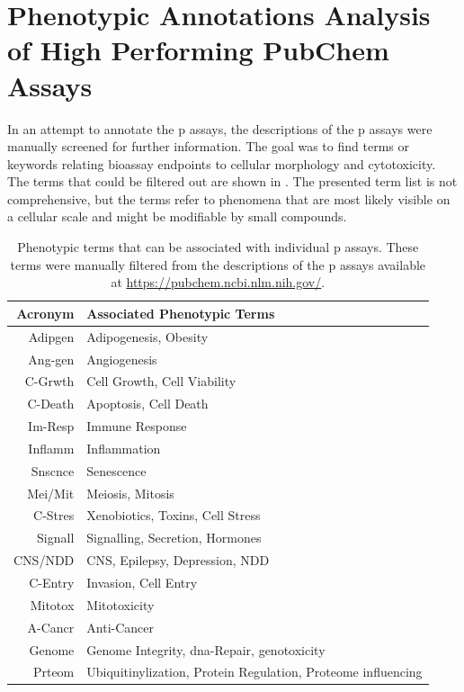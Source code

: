 \section{Phenotypic Annotations Analysis of High Performing PubChem Assays}\label{sec:phenotypicannotationsresults}
In an attempt to annotate the \acl{p} assays, the descriptions of the \acl{p} assays were manually screened for further information. The goal was to find terms or keywords relating bioassay endpoints to cellular morphology and cytotoxicity. The terms that could be filtered out are shown in . The presented term list is not comprehensive, but the terms refer to phenomena that are most likely visible on a cellular scale and might be modifiable by small compounds.
\begin{table}[H]
	\centering
	\caption[Phenotypic Terms That Can be Associated with Individual \acl{p} Assays]{Phenotypic terms that can be associated with individual \acl{p} assays. These terms were manually filtered from the descriptions of the \acl{p} assays available at \url{https://pubchem.ncbi.nlm.nih.gov/}\cite{Pubchem2021}.}
	\label{tab:phenotypicterms}
	\begin{tabularx}{0.8\textwidth}{rl}
		\toprule
		Acronym & Associated Phenotypic Terms\\
		\midrule
		Adipgen & Adipogenesis, Obesity\\
		Ang-gen & Angiogenesis\\
		C-Grwth & Cell Growth, Cell Viability\\
		C-Death & Apoptosis, Cell Death\\
		Im-Resp & Immune Response\\
		Inflamm & Inflammation\\
		Snscnce & Senescence\\
		Mei/Mit & Meiosis, Mitosis\\
		C-Stres & Xenobiotics, Toxins, Cell Stress\\
		Signall & Signalling, Secretion, Hormones\\
		CNS/NDD & CNS, Epilepsy, Depression, NDD\\
		C-Entry & Invasion, Cell Entry\\
		Mitotox & Mitotoxicity\\
		A-Cancr & Anti-Cancer\\
		Genome & Genome Integrity, \ac{dna}-Repair, genotoxicity\\
		Prteom & Ubiquitinylization, Protein Regulation, Proteome influencing\\		
		\bottomrule
	\end{tabularx}
\end{table}\noindent
